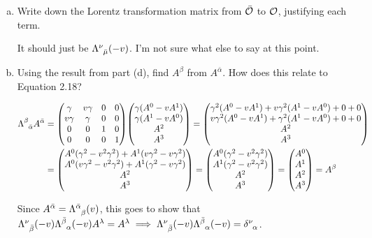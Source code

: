 \documentclass[gr-notes.tex]{subfiles}
\begin{document}
\begin{enumerate}[(a)]
\item Write down the Lorentz transformation matrix from $\bar{\mathcal{O}}$ to $\mathcal{O}$, justifying each term.

It should just be $\tensor{\Lambda}{^\nu_{\bar\mu}}(-v)$. I'm not sure what else to say at this point.

\item Using the result from part (d), find $A^\beta$ from $A^{\bar\alpha}$. How does this relate to Equation 2.18?

\begin{align*}
  \tensor{\Lambda}{^\beta_{\bar\alpha}} A^{\bar\alpha} &=
  \mqty(  \gamma & v \gamma & 0 & 0 \\
        v \gamma &   \gamma & 0 & 0 \\
               0 &        0 & 1 & 0 \\
               0 &        0 & 0 & 1)
  \mqty(\gamma (A^0 - v A^1) \\
        \gamma (A^1 - v A^0) \\
        A^2 \\
        A^3) =
  \mqty(  \gamma^2 (A^0 - v A^1) + v \gamma^2 (A^1 - v A^0) + 0 + 0 \\
        v \gamma^2 (A^0 - v A^1) +   \gamma^2 (A^1 - v A^0) + 0 + 0 \\
        A^2 \\
        A^3)
  \\ &=
  \mqty(A^0 (  \gamma^2 - v^2 \gamma^2) + A^1 (v \gamma^2 - v \gamma^2) \\
        A^0 (v \gamma^2 - v^2 \gamma^2) + A^1 (  \gamma^2 - v \gamma^2) \\
        A^2 \\
        A^3) =
  \mqty(A^0 (\gamma^2 - v^2 \gamma^2) \\
        A^1 (\gamma^2 - v^2 \gamma^2) \\
        A^2 \\
        A^3) =
  \mqty(A^0 \\ A^1 \\ A^2 \\ A^3) =
  A^\beta
\end{align*}

Since $A^{\bar\alpha} = \tensor{\Lambda}{^{\bar\alpha}_\beta}(v)$, this goes to show that $\tensor{\Lambda}{^\nu_{\bar\beta}}(-v) \tensor{\Lambda}{^{\bar\beta}_\alpha}(-v) A^\lambda = A^\lambda \implies \tensor{\Lambda}{^\nu_{\bar\beta}}(-v) \tensor{\Lambda}{^{\bar\beta}_\alpha}(-v) = \tensor{\delta}{^\nu_\alpha}$.


\end{enumerate}
\end{document}
